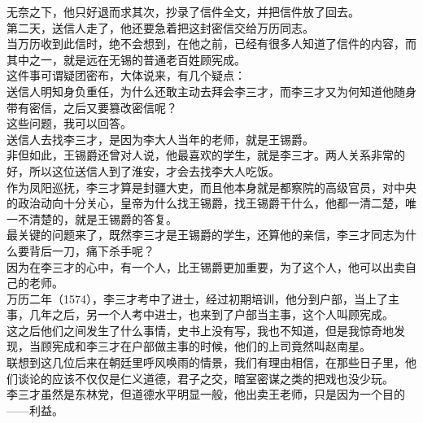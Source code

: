 \begin{multicols}{\theparacolNo}
无奈之下，他只好退而求其次，抄录了信件全文，并把信件放了回去。\\

第二天，送信人走了，他还要急着把这封密信交给万历同志。\\

当万历收到此信时，绝不会想到，在他之前，已经有很多人知道了信件的内容，而其中之一，就是远在无锡的普通老百姓顾宪成。\\

这件事可谓疑团密布，大体说来，有几个疑点：\\

送信人明知身负重任，为什么还敢主动去拜会李三才，而李三才又为何知道他随身带有密信，之后又要篡改密信呢？\\

这些问题，我可以回答。\\

送信人去找李三才，是因为李大人当年的老师，就是王锡爵。\\

非但如此，王锡爵还曾对人说，他最喜欢的学生，就是李三才。两人关系非常的好，所以这位送信人到了淮安，才会去找李大人吃饭。\\

作为凤阳巡抚，李三才算是封疆大吏，而且他本身就是都察院的高级官员，对中央的政治动向十分关心，皇帝为什么找王锡爵，找王锡爵干什么，他都一清二楚，唯一不清楚的，就是王锡爵的答复。\\

最关键的问题来了，既然李三才是王锡爵的学生，还算他的亲信，李三才同志为什么要背后一刀，痛下杀手呢？\\

因为在李三才的心中，有一个人，比王锡爵更加重要，为了这个人，他可以出卖自己的老师。\\

万历二年（1574），李三才考中了进士，经过初期培训，他分到户部，当上了主事，几年之后，另一个人考中进士，也来到了户部当主事，这个人叫顾宪成。\\

这之后他们之间发生了什么事情，史书上没有写，我也不知道，但是我惊奇地发现，当顾宪成和李三才在户部做主事的时候，他们的上司竟然叫赵南星。\\

联想到这几位后来在朝廷里呼风唤雨的情景，我们有理由相信，在那些日子里，他们谈论的应该不仅仅是仁义道德，君子之交，暗室密谋之类的把戏也没少玩。\\

李三才虽然是东林党，但道德水平明显一般，他出卖王老师，只是因为一个目的——利益。\\


\end{multicols}
